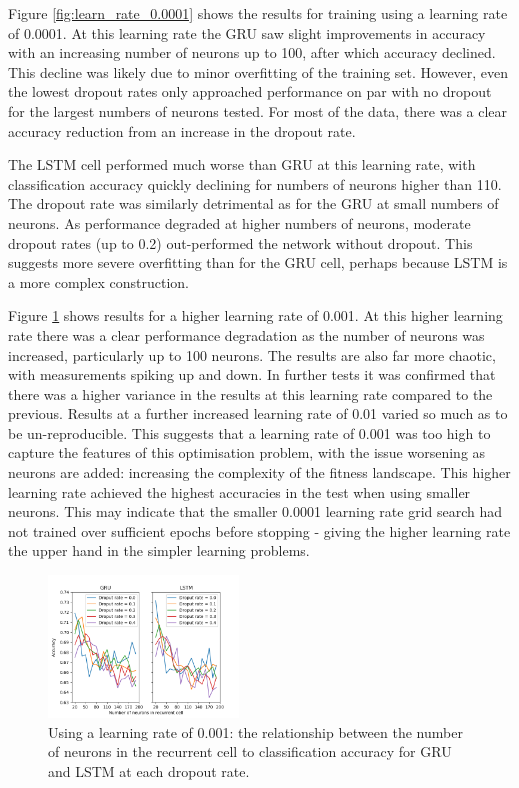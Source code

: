    Figure \ref{fig:learn_rate_0.0001} shows the results for training using a
    learning rate of 0.0001. At this learning rate the GRU saw slight improvements in
    accuracy with an increasing number of neurons up to 100, after which
    accuracy declined. This decline was likely due to minor overfitting of the
    training set. However, even the lowest dropout rates only approached
    performance on par with no dropout for the largest numbers of neurons
    tested. For most of the data, there was a clear accuracy reduction from an
    increase in the dropout rate.

    The LSTM cell performed much worse than GRU at this learning rate, with
    classification accuracy quickly declining for numbers of neurons higher than
    110. The dropout rate was similarly detrimental as for the GRU at
    small numbers of neurons. As performance degraded at higher numbers of
    neurons, moderate dropout rates (up to 0.2) out-performed the network without
    dropout. This suggests more severe overfitting than for the GRU cell,
    perhaps because LSTM is a more complex construction. 

    Figure \ref{fig:learn_rate_0.001} shows results for a higher learning rate
    of 0.001. At this higher learning rate there was a clear performance
    degradation as the number of neurons was increased, particularly up to 100
    neurons. The results are also far more chaotic, with measurements spiking up
    and down. In further tests it was confirmed that there was a higher variance in
    the results at this learning rate compared to the previous. Results at a
    further increased learning rate of 0.01 varied so much as to be
    un-reproducible. This suggests that a learning rate of 0.001 was too high to
    capture the features of this optimisation problem, with the issue worsening
    as neurons are added: increasing the complexity of the fitness landscape.
    This higher learning rate achieved the highest accuracies in the test when
    using smaller neurons. This may indicate that the smaller 0.0001 learning rate grid
    search had not trained over sufficient epochs before stopping - giving the
    higher learning rate the upper hand in the simpler learning problems.
    
        \begin{figure}[ht]
      \includegraphics[width=0.45\textwidth]{Figures/n_neurons_plot-0-001.png}
      \caption{Using a learning rate of 0.001: the relationship between the number of neurons in the recurrent
        cell to classification accuracy for GRU and LSTM at each dropout rate.}
      \label{fig:learn_rate_0.001}
    \end{figure}

